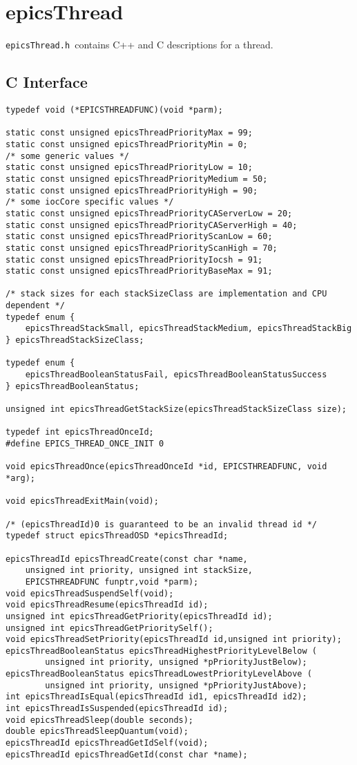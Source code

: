 \section{epicsThread}

\verb|epicsThread.h |contains C++ and C descriptions for a thread.

\subsection{C Interface}

\begin{verbatim}typedef void (*EPICSTHREADFUNC)(void *parm);

static const unsigned epicsThreadPriorityMax = 99;
static const unsigned epicsThreadPriorityMin = 0;
/* some generic values */
static const unsigned epicsThreadPriorityLow = 10;
static const unsigned epicsThreadPriorityMedium = 50;
static const unsigned epicsThreadPriorityHigh = 90;
/* some iocCore specific values */
static const unsigned epicsThreadPriorityCAServerLow = 20;
static const unsigned epicsThreadPriorityCAServerHigh = 40;
static const unsigned epicsThreadPriorityScanLow = 60;
static const unsigned epicsThreadPriorityScanHigh = 70;
static const unsigned epicsThreadPriorityIocsh = 91;
static const unsigned epicsThreadPriorityBaseMax = 91;

/* stack sizes for each stackSizeClass are implementation and CPU dependent */
typedef enum {
    epicsThreadStackSmall, epicsThreadStackMedium, epicsThreadStackBig
} epicsThreadStackSizeClass;

typedef enum {
    epicsThreadBooleanStatusFail, epicsThreadBooleanStatusSuccess
} epicsThreadBooleanStatus;

unsigned int epicsThreadGetStackSize(epicsThreadStackSizeClass size);

typedef int epicsThreadOnceId;
#define EPICS_THREAD_ONCE_INIT 0

void epicsThreadOnce(epicsThreadOnceId *id, EPICSTHREADFUNC, void *arg);

void epicsThreadExitMain(void);

/* (epicsThreadId)0 is guaranteed to be an invalid thread id */
typedef struct epicsThreadOSD *epicsThreadId;

epicsThreadId epicsThreadCreate(const char *name,
    unsigned int priority, unsigned int stackSize,
    EPICSTHREADFUNC funptr,void *parm);
void epicsThreadSuspendSelf(void);
void epicsThreadResume(epicsThreadId id);
unsigned int epicsThreadGetPriority(epicsThreadId id);
unsigned int epicsThreadGetPrioritySelf();
void epicsThreadSetPriority(epicsThreadId id,unsigned int priority);
epicsThreadBooleanStatus epicsThreadHighestPriorityLevelBelow (
        unsigned int priority, unsigned *pPriorityJustBelow);
epicsThreadBooleanStatus epicsThreadLowestPriorityLevelAbove (
        unsigned int priority, unsigned *pPriorityJustAbove);
int epicsThreadIsEqual(epicsThreadId id1, epicsThreadId id2);
int epicsThreadIsSuspended(epicsThreadId id);
void epicsThreadSleep(double seconds);
double epicsThreadSleepQuantum(void);
epicsThreadId epicsThreadGetIdSelf(void);
epicsThreadId epicsThreadGetId(const char *name);


\end{verbatim}
